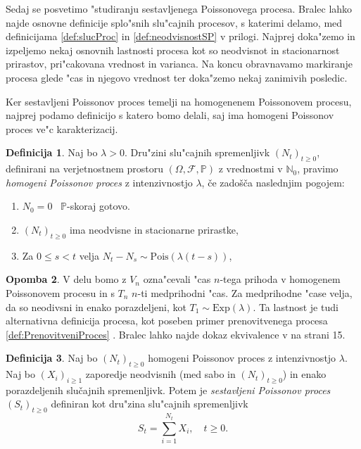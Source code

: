 \documentclass[12pt, a4paper, reqno]{amsart}
\theoremstyle{definition}
\newtheorem{definicija}{Definicija}[section]
\newtheorem{opomba}[definicija]{Opomba}
\theoremstyle{plain}
\newcommand{\N}{\mathbb{N}}
\newcommand{\Prob}{\mathbb{P}}
\newcommand{\1}{\mathds{1}}
\newcommand{\Pois}[1]{\text{Pois}(#1)}
\newcommand*{\refPriloga}[1]{%
  \begingroup
    \hypersetup{
      linkcolor=properpurple,
      linkbordercolor=properpurple,
    }%
    \ref{#1}%
  \endgroup
}
\begin{document}
    Sedaj se posvetimo "studiranju sestavljenega Poissonovega procesa. Bralec lahko najde 
    osnovne definicije splo"snih slu"cajnih procesov, s katerimi delamo,
     med definicijama \refPriloga{def:slucProc} in \refPriloga{def:neodvisnostSP} v prilogi.
    Najprej doka"zemo in izpeljemo nekaj osnovnih lastnosti procesa kot so neodvisnot in stacionarnost
    prirastov, pri"cakovana vrednost in varianca. Na koncu obravnavamo markiranje procesa glede "cas in 
    njegovo vrednost ter doka"zemo nekaj zanimivih posledic.

    Ker sestavljeni Poissonov proces temelji na homogenenem Poissonovem procesu, najprej podamo definicijo 
    s katero bomo delali, saj ima homogeni Poissonov proces ve"c karakterizacij. 

    \begin{definicija}
        Naj bo $\lambda > 0$. Dru"zini slu"cajnih spremenljivk $(N_t)_{t\geq 0}$, definirani na verjetnostnem 
        prostoru $(\Omega, \mathcal{F}, \mathbb{P})$ z vrednostmi v $\N_0$, pravimo 
        \textit{homogeni Poissonov proces} z intenzivnostjo $\lambda$, če zadošča naslednjim pogojem:
        \begin{enumerate}
            \item $N_0 = 0$ \ $\Prob$-skoraj gotovo.
            \item $(N_t)_{t\geq 0}$ ima neodvisne in stacionarne prirastke,
            \item Za $0 \leq s < t$ velja $ N_t - N_s \sim\Pois{\lambda(t - s)}$,
        \end{enumerate}
        \label{def:HPP}
    \end{definicija}

    \begin{opomba}
    V delu bomo z $V_n$ ozna"cevali "cas $n$-tega prihoda v homogenem Poissonovem procesu in s $T_n$ $n$-ti 
    medprihodni "cas. Za medprihodne "case velja, da so neodivsni in enako porazdeljeni, kot 
    $T_1 \sim \text{Exp}(\lambda)$. Ta lastnost je tudi alternativna definicija procesa, kot poseben 
    primer prenovitvenega procesa \refPriloga{def:PrenovitveniProces}. Bralec 
    lahko najde dokaz ekvivalence v \cite{10} na strani 15.
    \end{opomba}

    \begin{definicija}
        Naj bo $(N_t)_{t\geq0}$ homogeni Poissonov proces z intenzivnostjo $\lambda$. 
        Naj bo $(X_i)_{i\geq1}$ zaporedje neodvisnih (med sabo in $(N_t)_{t\geq0}$) in enako 
        porazdeljenih slučajnih spremenljivk. Potem je 
        \textit{sestavljeni Poissonov proces} $(S_t)_{t\geq0}$ definiran kot dru"zina
        slu"cajnih spremenljivk
        $$
            S_t = \sum_{i=1}^{N_t} X_i, \quad t\geq0.
        $$
        \label{def:CPP}
    \end{definicija}
\end{document}
